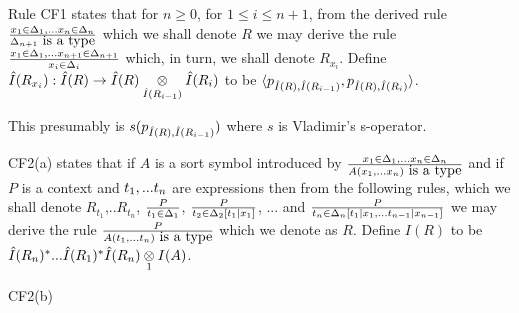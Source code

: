 \begin{point}
Rule CF1 states that for $n \geq 0$, for $1 \leq i \leq n+1$, from the derived rule 
$\frac{\xDelta{n}}{\isT{\Delta_{n+1}}}$ which we shall denote $R$ 
we may derive the rule
$\frac{\xDelta{n+1}}{\ofT{x_i}{\Delta_i}}$ which, in turn, we shall denote $R_{x_i}$.
Define $\Ihat(R_{x_i}) :  \Ihat(R) \morph \crossx{\Ihat(R)}{\Ihat(R_i)}{\Ihat(R_{i-1})}$
to be $\tuple{p_{\Ihat(R),\Ihat(R_{i-1})},p_{\Ihat(R),\Ihat(R_{i})}}$. 

This presumably is $s(p_{\Ihat(R),\Ihat(R_{i-1})})$ where $s$ is Vladimir's s-operator.
\end{point}
\begin{point}
CF2(a) states that if $A$ is a sort symbol introduced by
$\frac{\xDelta{n}}{\isT{A(\xn)}}$ 
and if $P$ is a context and $\tn$ are expressions then from the following rules, which we shall denote $R_{t_1}$,..$R_{t_n}$,
$\frac{P}{\ofT{t_1}{\Delta_1}}$,
$\frac{P}{\ofT{t_2}{\Delta_2[t_1|x_1]}}$,
... and 
$\frac{P}{\ofT{t_n}{\Delta_n[t_1|x_1,...t_{n-1}|x_{n-1}]}}$
we may derive the rule
$\frac{P}{\isT{A(t_1,...t_n)}}$ which we denote as $R$. 
Define $I(R)$ to be $\Ihat(R_n)^*...\Ihat(R_1)^*\crossx{\Ihat(R_n)}{I(A)}{1}$.
\end{point}
\begin{point}
CF2(b) 
\end{point}

